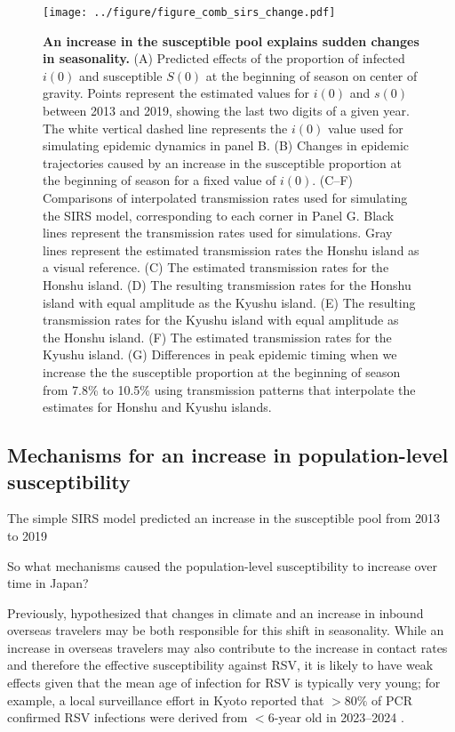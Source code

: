 \documentclass[12pt]{article}
\begin{document}
\begin{figure}[!th]
\begin{center}
\texttt{[image: ../figure/figure\_comb\_sirs\_change.pdf]}
\caption{
\textbf{An increase in the susceptible pool explains sudden changes in seasonality.}
(A) Predicted effects of the proportion of infected $i(0)$ and susceptible $S(0)$ at the beginning of season on center of gravity.
Points represent the estimated values for $i(0)$ and $s(0)$ between 2013 and 2019, showing the last two digits of a given year.
The white vertical dashed line represents the $i(0)$ value used for simulating epidemic dynamics in panel B.
(B) Changes in epidemic trajectories caused by an increase in the susceptible proportion at the beginning of season for a fixed value of $i(0)$.
(C--F) Comparisons of interpolated transmission rates used for simulating the SIRS model, corresponding to each corner in Panel G. 
Black lines represent the transmission rates used for simulations. 
Gray lines represent the estimated transmission rates the Honshu island as a visual reference.
(C) The estimated transmission rates for the Honshu island.
(D) The resulting transmission rates for the Honshu island with equal amplitude as the Kyushu island.
(E) The resulting transmission rates for the Kyushu island with equal amplitude as the Honshu island.
(F) The estimated transmission rates for the Kyushu island.
(G) Differences in peak epidemic timing when we increase the the susceptible proportion at the beginning of season from 7.8\% to 10.5\% using transmission patterns that interpolate the estimates for Honshu and Kyushu islands. 
}
\label{fig:fig3}
\end{center}
\end{figure}

\subsection*{Mechanisms for an increase in population-level susceptibility}

The simple SIRS model predicted an increase in the susceptible pool from 2013 to 2019

So what mechanisms caused the population-level susceptibility to increase over time in Japan?



Previously, \cite{wagatsuma2021shifts} hypothesized that changes in climate and an increase in inbound overseas travelers may be both responsible for this shift in seasonality.
While an increase in overseas travelers may also contribute to the increase in contact rates and therefore the effective susceptibility against RSV, it is likely to have weak effects given that the mean age of infection for RSV is typically very young;
for example, a local surveillance effort in Kyoto reported that $>80\%$ of PCR confirmed RSV infections were derived from $<6$-year old in 2023--2024 \citep{matsumura2025epidemiology}.
\end{document}

